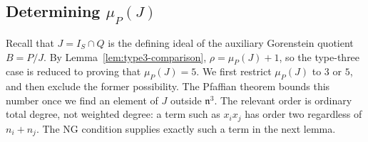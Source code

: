 \documentclass[10pt]{amsart}
\theoremstyle{plain}
\begin{document}
\subsection{\texorpdfstring{Determining \(\mu_P(J)\)}
{Determining the number of generators of J}}

Recall that \(J=I_S\cap Q\) is the defining ideal of the auxiliary
Gorenstein quotient \(B=P/J\).  By Lemma~\ref{lem:type3-comparison},
\(\rho=\mu_P(J)+1\), so the type-three case is reduced to proving that
\(\mu_P(J)=5\).  We first restrict \(\mu_P(J)\) to \(3\) or \(5\), and then
exclude the former possibility.  The Pfaffian theorem bounds this
number once we find an element of \(J\) outside \(\mathfrak n^3\).
The relevant order is ordinary total degree, not weighted degree: a
term such as \(x_ix_j\) has order two regardless of \(n_i+n_j\).
The NG condition supplies exactly such a term in the next lemma.
\end{document}
